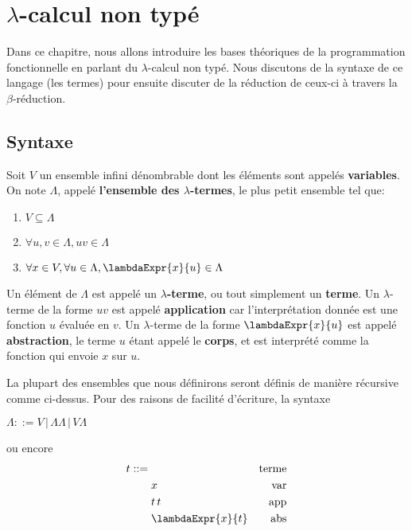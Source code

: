 \chapter{$\lambda$-calcul non typé}

Dans ce chapitre, nous allons introduire les bases théoriques de la
programmation fonctionnelle en parlant du $\lambda$-calcul non typé.
Nous discutons de la syntaxe de ce langage (les termes) pour ensuite discuter de
la réduction de ceux-ci à travers la $\beta$-réduction.


\section{Syntaxe}

\begin{definition} 
  Soit $V$ un ensemble infini dénombrable dont les éléments sont appelés \textbf{variables}. On note $\Lambda$, appelé \textbf{l'ensemble des $\lambda$-termes}, le plus petit
  ensemble tel que:
  \begin{enumerate}
    \item $V \subseteq \Lambda$
    \item $\forall u, v \in \Lambda, uv \in \Lambda$
    \item $\forall x \in V, \forall u \in \Lambda, \lambdaExpr{x}{u} \in \Lambda$
  \end{enumerate}
\end{definition}

Un élément de $\Lambda$ est appelé un \textbf{$\lambda$-terme}, ou tout
simplement un \textbf{terme}.
Un $\lambda$-terme de la forme $uv$ est appelé \textbf{application} car
l'interprétation donnée est une fonction $u$ évaluée en $v$.
Un $\lambda$-terme de la forme $\lambdaExpr{x}{u}$ est appelé
\textbf{abstraction}, le terme $u$ étant appelé le \textbf{corps}, et est interprété comme la fonction qui envoie
$x$ sur $u$.

La plupart des ensembles que nous définirons seront définis de manière récursive
comme ci-dessus.
Pour des raisons de facilité d'écriture, la syntaxe
\begin{center}
  \begin{math}
    \Lambda ::= V \, | \, \Lambda \Lambda \, | \, V \Lambda
  \end{math}
\end{center}

ou encore
\begin{align*}
  t ::= & \, & \text{terme} \\
        & \; x & \text{var} \\
        & \; t \, t & \text{app} \\
        & \; \lambdaExpr{x}{t} & \text{abs}
\end{align*}

